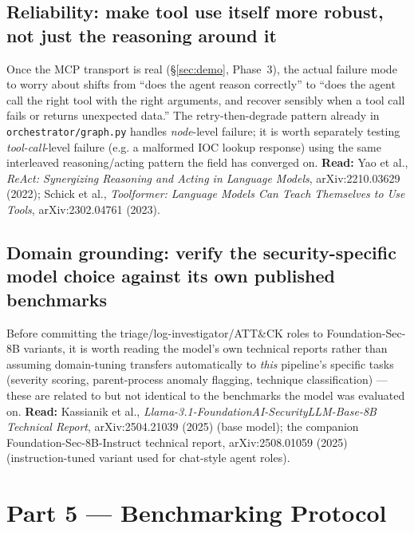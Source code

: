 \documentclass[11pt]{article}
\begin{document}
\subsection{Reliability: make tool use itself more robust, not just the reasoning around it}
Once the MCP transport is real (\S\ref{sec:demo}, Phase~3), the actual failure mode to worry about shifts from ``does the agent reason correctly'' to ``does the agent call the right tool with the right arguments, and recover sensibly when a tool call fails or returns unexpected data.'' The retry-then-degrade pattern already in \texttt{orchestrator/graph.py} handles \emph{node}-level failure; it is worth separately testing \emph{tool-call}-level failure (e.g. a malformed IOC lookup response) using the same interleaved reasoning/acting pattern the field has converged on. \textbf{Read:} Yao et al., \emph{ReAct: Synergizing Reasoning and Acting in Language Models}, arXiv:2210.03629 (2022); Schick et al., \emph{Toolformer: Language Models Can Teach Themselves to Use Tools}, arXiv:2302.04761 (2023).

\subsection{Domain grounding: verify the security-specific model choice against its own published benchmarks}
Before committing the triage/log-investigator/ATT\&CK roles to Foundation-Sec-8B variants, it is worth reading the model's own technical reports rather than assuming domain-tuning transfers automatically to \emph{this} pipeline's specific tasks (severity scoring, parent-process anomaly flagging, technique classification) --- these are related to but not identical to the benchmarks the model was evaluated on. \textbf{Read:} Kassianik et al., \emph{Llama-3.1-FoundationAI-SecurityLLM-Base-8B Technical Report}, arXiv:2504.21039 (2025) (base model); the companion Foundation-Sec-8B-Instruct technical report, arXiv:2508.01059 (2025) (instruction-tuned variant used for chat-style agent roles).

\section{Part 5 --- Benchmarking Protocol}
\label{sec:benchmark}
\end{document}

